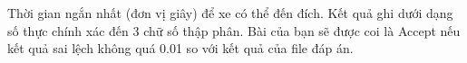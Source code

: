 Thời gian ngắn nhất (đơn vị giây) để xe có thể đến đích. Kết quả ghi dưới dạng số thực chính xác đến 3 chữ số thập phân. Bài của bạn sẽ được coi là Accept nếu kết quả sai lệch không quá 0.01 so với kết quả của file đáp án.

\